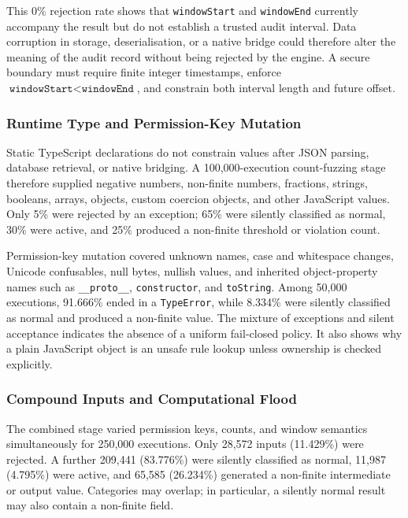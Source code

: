 This 0\% rejection rate shows that \texttt{windowStart} and \texttt{windowEnd} currently accompany the result but do not establish a trusted audit interval. Data corruption in storage, deserialisation, or a native bridge could therefore alter the meaning of the audit record without being rejected by the engine. A secure boundary must require finite integer timestamps, enforce \(\texttt{windowStart}<\texttt{windowEnd}\), and constrain both interval length and future offset.

\subsubsection{Runtime Type and Permission-Key Mutation}

Static TypeScript declarations do not constrain values after JSON parsing, database retrieval, or native bridging. A 100,000-execution count-fuzzing stage therefore supplied negative numbers, non-finite numbers, fractions, strings, booleans, arrays, objects, custom coercion objects, and other JavaScript values. Only 5\% were rejected by an exception; 65\% were silently classified as normal, 30\% were active, and 25\% produced a non-finite threshold or violation count.

Permission-key mutation covered unknown names, case and whitespace changes, Unicode confusables, null bytes, nullish values, and inherited object-property names such as \texttt{\_\_proto\_\_}, \texttt{constructor}, and \texttt{toString}. Among 50,000 executions, 91.666\% ended in a \texttt{TypeError}, while 8.334\% were silently classified as normal and produced a non-finite value. The mixture of exceptions and silent acceptance indicates the absence of a uniform fail-closed policy. It also shows why a plain JavaScript object is an unsafe rule lookup unless ownership is checked explicitly.

\subsubsection{Compound Inputs and Computational Flood}

The combined stage varied permission keys, counts, and window semantics simultaneously for 250,000 executions. Only 28,572 inputs (11.429\%) were rejected. A further 209,441 (83.776\%) were silently classified as normal, 11,987 (4.795\%) were active, and 65,585 (26.234\%) generated a non-finite intermediate or output value. Categories may overlap; in particular, a silently normal result may also contain a non-finite field.

